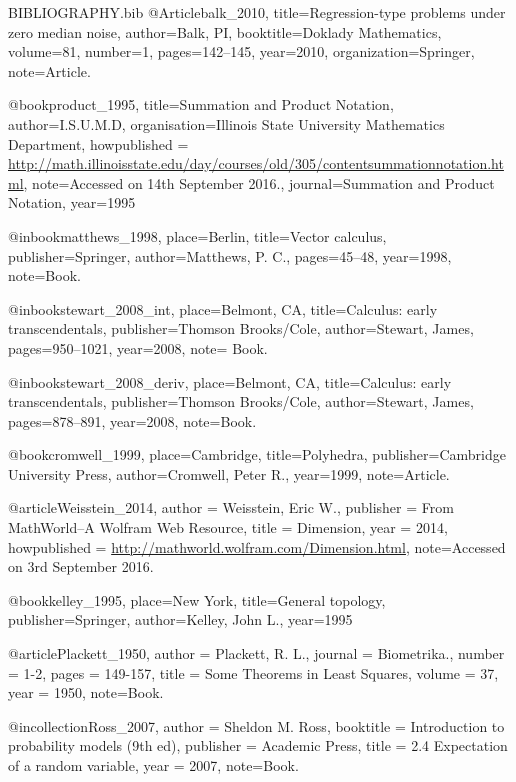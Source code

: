 \RequirePackage{filecontents}
\begin{filecontents}{BIBLIOGRAPHY.bib}
@Article{balk_2010,
  title={Regression-type problems under zero median noise},
  author={Balk, PI},
  booktitle={Doklady Mathematics},
  volume={81},
  number={1},
  pages={142--145},
  year={2010},
  organization={Springer},
  note={Article.}}

@book{product_1995, 
 title={Summation and Product Notation},
 author={I.S.U.M.D},
 organisation={Illinois State University Mathematics Department},
 howpublished = {\url{http://math.illinoisstate.edu/day/courses/old/305/contentsummationnotation.html}},
 note={Accessed on 14th September 2016.},
 journal={Summation and Product Notation}, 
 year={1995}}
 
@inbook{matthews_1998, 
 place={Berlin}, 
 title={Vector calculus}, 
 publisher={Springer}, 
 author={Matthews, P. C.}, 
 pages={45--48},
 year={1998},
 note={Book.}}


@inbook{stewart_2008_int, 
 place={Belmont, CA}, 
 title={Calculus: early transcendentals}, 
 publisher={Thomson Brooks/Cole}, 
 author={Stewart, James}, 
 pages={950--1021},
 year={2008},
 note= {Book.}}
 
 @inbook{stewart_2008_deriv, 
 place={Belmont, CA}, 
 title={Calculus: early transcendentals}, 
 publisher={Thomson Brooks/Cole}, 
 author={Stewart, James}, 
 pages={878--891},
 year={2008},
 note={Book.}}
 
@book{cromwell_1999, 
 place={Cambridge}, 
 title={Polyhedra}, 
 publisher={Cambridge University Press}, 
 author={Cromwell, Peter R.}, 
 year={1999},
 note={Article.}}
 
@article{Weisstein_2014,
 author = {Weisstein, Eric W.},
 publisher = {From MathWorld--A Wolfram Web Resource},
 title = {Dimension},
 year = {2014},
 howpublished = {\url{http://mathworld.wolfram.com/Dimension.html}},
 note={Accessed on 3rd September 2016.}}

@book{kelley_1995, 
 place={New York}, 
 title={General topology}, 
 publisher={Springer}, 
 author={Kelley, John L.}, 
 year={1995}}
 
@article{Plackett_1950,
 author = {Plackett, R. L.},
 journal = {Biometrika.},
 number = {1-2},
 pages = {149-157},
 title = {Some Theorems in Least Squares},
 volume = {37},
 year = {1950},
 note={Book.}}

@incollection{Ross_2007,
 author = {Sheldon M. Ross},
 booktitle = {Introduction to probability models (9th ed)},
 publisher = {Academic Press},
 title = {2.4 Expectation of a random variable},
 year = {2007},
 note={Book.}}


\end{filecontents}
